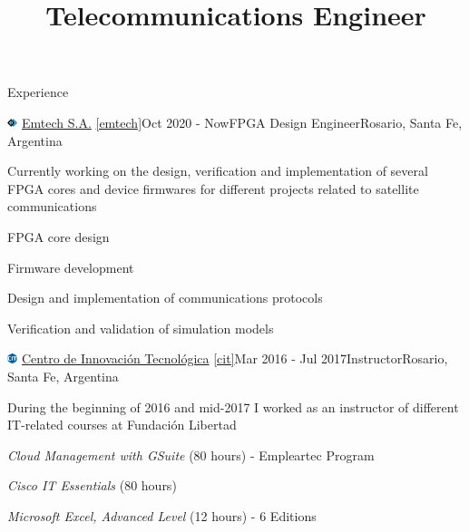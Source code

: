 \documentclass{resume} %
\title{Telecommunications Engineer}
\begin{document}

\begin{rSection}{Experience}

    \begin{rSubsection}{\includegraphics[height=0.3cm]{images/emtech.png} \href{http://emtech.com.ar/}{Emtech S.A.} \ref{emtech}}{Oct 2020 - Now}{FPGA Design Engineer}{Rosario, Santa Fe, Argentina}
        \item[]Currently working on the design, verification and implementation of several FPGA cores and device firmwares for different projects related to satellite communications
        \item FPGA core design
        \item Firmware development
        \item Design and implementation of communications protocols
        \item Verification and validation of simulation models
    \end{rSubsection}


    \begin{rSubsection}{\includegraphics[height=0.3cm]{images/cit.png} \href{https://www.centroit.org.ar/}{Centro de Innovación Tecnológica} \ref{cit}}{Mar 2016 - Jul 2017}{Instructor}{Rosario, Santa Fe, Argentina}
        \item[]During the beginning of 2016 and mid-2017 I worked as an instructor of different IT-related courses at Fundación Libertad
        \item \textit{Cloud Management with GSuite} (80 hours) - Empleartec Program
        \item \textit{Cisco IT Essentials} (80 hours)
        \item \textit{Microsoft Excel, Advanced Level} (12 hours) - 6 Editions

    \end{rSubsection}



\end{rSection}
\end{document}

